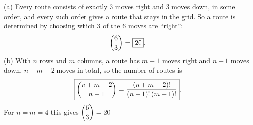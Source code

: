 (a) Every route consists of exactly $3$ moves right and $3$ moves down, in some order, and every such order gives a route that stays in the grid. So a route is determined by choosing which $3$ of the $6$ moves are ``right'':
\[
\dbinom63=\boxed{20}.
\]
(b) With $n$ rows and $m$ columns, a route has $m-1$ moves right and $n-1$ moves down, $n+m-2$ moves in total, so the number of routes is
\[
\boxed{\dbinom{n+m-2}{n-1}=\dfrac{(n+m-2)!}{(n-1)!\,(m-1)!}} .
\]
For $n=m=4$ this gives $\dbinom63=20$.
